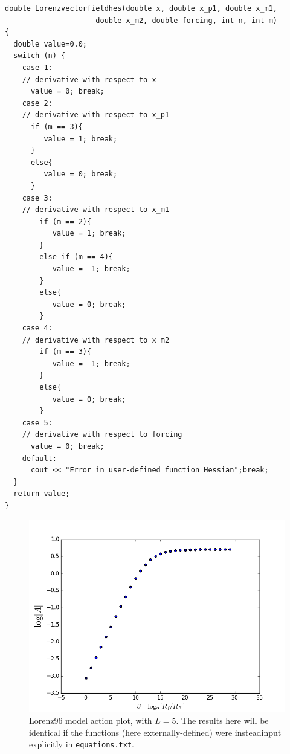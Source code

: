 \documentclass[11pt]{article}
\begin{document}
{\begin{verbatim}
double Lorenzvectorfieldhes(double x, double x_p1, double x_m1, 
                     double x_m2, double forcing, int n, int m)
{
  double value=0.0;
  switch (n) {
    case 1:
    // derivative with respect to x
      value = 0; break;
    case 2:
    // derivative with respect to x_p1
      if (m == 3){
         value = 1; break;
      }
      else{
         value = 0; break;
      }      
    case 3:
    // derivative with respect to x_m1
        if (m == 2){
           value = 1; break;
        }
        else if (m == 4){
           value = -1; break;
        }      
        else{
           value = 0; break;
        }      
    case 4:
    // derivative with respect to x_m2
        if (m == 3){
           value = -1; break;
        }
        else{
           value = 0; break;
        }      
    case 5:
    // derivative with respect to forcing
      value = 0; break;
    default:
      cout << "Error in user-defined function Hessian";break;
  } 
  return value;
}
\end{verbatim}


\begin{figure}[h]
\centering
\includegraphics[width=.8\textwidth]{figure/Lorenz96_ext/action.png}
\caption{Lorenz96 model action plot, with $L = 5$. The results here will be identical if the functions (here externally-defined) were insteadinput explicitly in \texttt{equations.txt}.}
\label{fig:Lorenz96_ext_action}
\end{figure}

}
\end{document}
